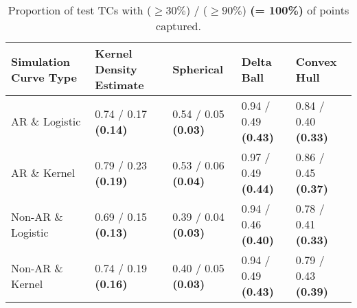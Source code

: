 \begin{table}[ht!]
\centering
\caption{Proportion of test TCs with ($\geq 30\%$) / ($\geq 90\%$) \textbf{(= 100\%)} of points captured.} 
\label{tab:prop_captured}
\begin{tabular}{R{1.4in}L{1.1in}L{.95in}L{.95in}L{.95in}}
  \hline
\hline
Simulation Curve Type & Kernel Density Estimate & Spherical & Delta Ball & Convex Hull \\ 
  \hline
AR \& Logistic & 0.74 / 0.17 \textbf{(0.14)} & 0.54 / 0.05 \textbf{(0.03)} & 0.94 / 0.49 \textbf{(0.43)} & 0.84 / 0.40 \textbf{(0.33)} \\ 
  AR \& Kernel & 0.79 / 0.23 \textbf{(0.19)} & 0.53 / 0.06 \textbf{(0.04)} & 0.97 / 0.49 \textbf{(0.44)} & 0.86 / 0.45 \textbf{(0.37)} \\ 
  Non-AR \& Logistic & 0.69 / 0.15 \textbf{(0.13)} & 0.39 / 0.04 \textbf{(0.03)} & 0.94 / 0.46 \textbf{(0.40)} & 0.78 / 0.41 \textbf{(0.33)} \\ 
  Non-AR \& Kernel & 0.74 / 0.19 \textbf{(0.16)} & 0.40 / 0.05 \textbf{(0.03)} & 0.94 / 0.49 \textbf{(0.43)} & 0.79 / 0.43 \textbf{(0.39)} \\ 
   \hline
\end{tabular}
\end{table}

